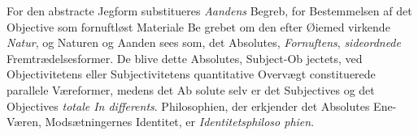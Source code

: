 \documentclass[12pt,a4paper]{book}
\begin{document}
For den abstracte Jegform substitueres \emph{Aandens} Begreb, for
Bestemmelsen af det Objective som fornuftløst Materiale Be\-%
grebet om den efter Øiemed virkende \emph{Natur}, og Naturen og
Aanden sees som, det Absolutes, \emph{Fornuftens}, \emph{sideordnede}
Fremtrædelsesformer. De blive dette Absolutes, Subject-Ob\-%
jectets, ved Objectivitetens eller Subjectivitetens quantitative
Overvægt constituerede parallele Væreformer, medens det Ab\-%
solute selv er det Subjectives og det Objectives \emph{totale In\-%
differents}. Philosophien, der erkjender det Absolutes Ene-%
Væren, Modsætningernes Identitet, er \emph{Identitetsphiloso\-%
phien}.
\end{document}
